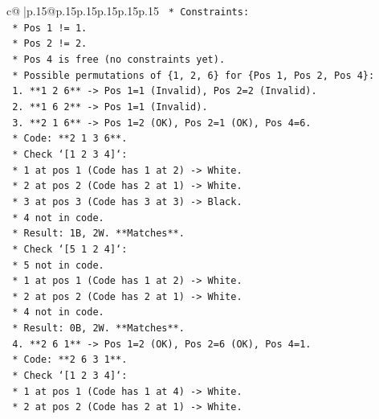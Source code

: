 \documentclass{article}
\begin{document}
{\begin{supertabular}{c@{$\;$}|p{.15\linewidth}@{}p{.15\linewidth}p{.15\linewidth}p{.15\linewidth}p{.15\linewidth}p{.15\linewidth}}
{{{\texttt{        *   Constraints:} \\
\texttt{            *   Pos 1 != 1.} \\
\texttt{            *   Pos 2 != 2.} \\
\texttt{            *   Pos 4 is free (no constraints yet).} \\
\texttt{        *   Possible permutations of \{1, 2, 6\} for \{Pos 1, Pos 2, Pos 4\}:} \\
\texttt{            1.  **1 2 6** {-}> Pos 1=1 (Invalid), Pos 2=2 (Invalid).} \\
\texttt{            2.  **1 6 2** {-}> Pos 1=1 (Invalid).} \\
\texttt{            3.  **2 1 6** {-}> Pos 1=2 (OK), Pos 2=1 (OK), Pos 4=6.} \\
\texttt{                *   Code: **2 1 3 6**.} \\
\texttt{                *   Check `{[}1 2 3 4{]}`:} \\
\texttt{                    *   1 at pos 1 (Code has 1 at 2) {-}> White.} \\
\texttt{                    *   2 at pos 2 (Code has 2 at 1) {-}> White.} \\
\texttt{                    *   3 at pos 3 (Code has 3 at 3) {-}> Black.} \\
\texttt{                    *   4 not in code.} \\
\texttt{                    *   Result: 1B, 2W. **Matches**.} \\
\texttt{                *   Check `{[}5 1 2 4{]}`:} \\
\texttt{                    *   5 not in code.} \\
\texttt{                    *   1 at pos 1 (Code has 1 at 2) {-}> White.} \\
\texttt{                    *   2 at pos 2 (Code has 2 at 1) {-}> White.} \\
\texttt{                    *   4 not in code.} \\
\texttt{                    *   Result: 0B, 2W. **Matches**.} \\
\texttt{            4.  **2 6 1** {-}> Pos 1=2 (OK), Pos 2=6 (OK), Pos 4=1.} \\
\texttt{                *   Code: **2 6 3 1**.} \\
\texttt{                *   Check `{[}1 2 3 4{]}`:} \\
\texttt{                    *   1 at pos 1 (Code has 1 at 4) {-}> White.} \\
\texttt{                    *   2 at pos 2 (Code has 2 at 1) {-}> White.} \\
}}}
\end{supertabular}}
\end{document}
